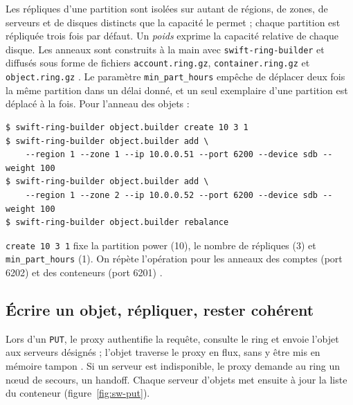 Les répliques d'une partition sont isolées sur autant de régions, de zones, de serveurs et de disques distincts que la
capacité le permet \parencite{swift-architecture} ; chaque partition est répliquée trois fois par défaut. Un \emph{poids}
exprime la capacité relative de chaque disque. Les anneaux sont construits à la main avec \texttt{swift-ring-builder} et
diffusés sous forme de fichiers \texttt{account.ring.gz}, \texttt{container.ring.gz} et \texttt{object.ring.gz}
\parencite{swift-ring}. Le paramètre \texttt{min\_\allowbreak part\_\allowbreak hours} empêche de déplacer deux fois la même partition dans un
délai donné, et un seul exemplaire d'une partition est déplacé à la fois. Pour l'anneau des objets :

\par\noindent\begin{minipage}{\linewidth}
\begin{lstlisting}[style=terminal]
$ swift-ring-builder object.builder create 10 3 1
$ swift-ring-builder object.builder add \
    --region 1 --zone 1 --ip 10.0.0.51 --port 6200 --device sdb --weight 100
$ swift-ring-builder object.builder add \
    --region 1 --zone 2 --ip 10.0.0.52 --port 6200 --device sdb --weight 100
$ swift-ring-builder object.builder rebalance
\end{lstlisting}
\end{minipage}\par

\texttt{create 10 3 1} fixe la partition power (10), le nombre de répliques (3) et \texttt{min\_part\_hours} (1). On répète
l'opération pour les anneaux des comptes (port 6202) et des conteneurs (port 6201) \parencite{swift-initial-rings}.

\subsection{Écrire un objet, répliquer, rester cohérent}\label{sec:sw-ecriture}

Lors d'un \texttt{PUT}, le proxy authentifie la requête, consulte le ring et envoie l'objet aux serveurs désignés ; l'objet
traverse le proxy en flux, sans y être mis en mémoire tampon \parencite{swift-architecture}. Si un serveur est indisponible, le
proxy demande au ring un nœud de secours, un \gls{handoff}. Chaque serveur d'objets met ensuite à jour la liste du
conteneur (figure~\ref{fig:sw-put}).

